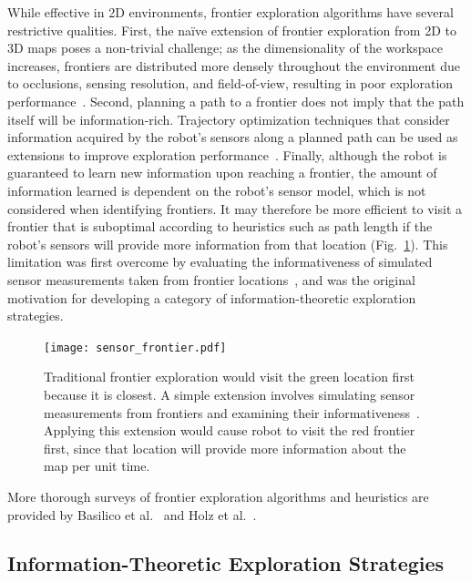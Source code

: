 While effective in 2D environments, frontier exploration algorithms have
several restrictive qualities. First, the na\"{i}ve extension of frontier exploration
from 2D to 3D maps poses a non-trivial challenge; as the
dimensionality of the workspace increases, frontiers are distributed more
densely throughout the environment due to occlusions, sensing resolution, and
field-of-view, resulting in poor exploration performance~\cite{shen20113d}.
Second, planning a path to a frontier does not imply that the path
itself will be information-rich. Trajectory optimization techniques that
consider information acquired by the robot's sensors along a planned path can be used
as extensions to improve exploration performance~\cite{sim2004online,kollar2008trajectory}.
Finally, although the robot is guaranteed to learn new information upon reaching a
frontier, the amount of information learned is dependent on the
robot's sensor model, which is not considered when identifying frontiers.
It may therefore be more efficient to visit a frontier that is
suboptimal according to heuristics such as path length if the robot's sensors
will provide more information from that location
(Fig.~\ref{fig:sensor_frontier}).
This limitation was first overcome by evaluating the informativeness of simulated
sensor measurements taken from frontier locations~\cite{gonzalez2002navigation}, and was the
original motivation for developing a category of information-theoretic exploration strategies.

\begin{figure}[t]
  \centering
  \centering
  \texttt{[image: sensor\_frontier.pdf]}
  \caption{Traditional frontier exploration would visit the green location first
    because it is closest. A simple extension involves simulating sensor
    measurements from frontiers and examining their informativeness~\cite{gonzalez2002navigation}. Applying this
    extension would cause robot to visit the red frontier first, since that
    location will provide more information about the map per unit time.\label{fig:sensor_frontier}}
\end{figure}

More thorough surveys of frontier exploration algorithms and heuristics are provided by
Basilico et al.~\cite{basilico2008evaluating} and Holz et al.~\cite{holz2011comparative}.

\subsection{Information-Theoretic Exploration Strategies}


